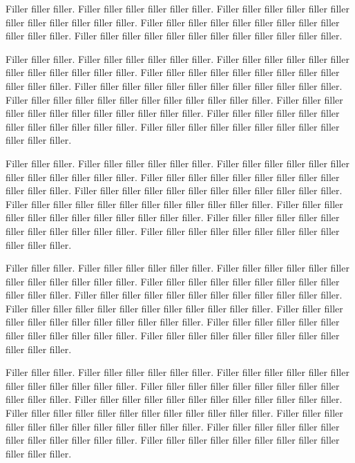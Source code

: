 \documentclass[landscape,twocolumn,letterpaper]{article}
\begin{document}
Filler filler filler.  Filler filler filler filler filler filler.
Filler filler filler filler filler filler filler filler filler filler
filler filler.  Filler filler filler filler filler filler filler filler
filler filler filler filler.  Filler filler filler filler filler filler
filler filler filler filler filler filler.

Filler filler filler.  Filler filler filler filler filler filler.
Filler filler filler filler filler filler filler filler filler filler
filler filler.  Filler filler filler filler filler filler filler filler
filler filler filler filler.  Filler filler filler filler filler filler
filler filler filler filler filler filler.  Filler filler filler filler
filler filler filler filler filler filler filler filler.  Filler filler
filler filler filler filler filler filler filler filler filler filler.
Filler filler filler filler filler filler filler filler filler filler
filler filler.  Filler filler filler filler filler filler filler filler
filler filler filler filler.

Filler filler filler.  Filler filler filler filler filler filler.
Filler filler filler filler filler filler filler filler filler filler
filler filler.  Filler filler filler filler filler filler filler filler
filler filler filler filler.  Filler filler filler filler filler filler
filler filler filler filler filler filler.  Filler filler filler filler
filler filler filler filler filler filler filler filler.  Filler filler
filler filler filler filler filler filler filler filler filler filler.
Filler filler filler filler filler filler filler filler filler filler
filler filler.  Filler filler filler filler filler filler filler filler
filler filler filler filler.

Filler filler filler.  Filler filler filler filler filler filler.
Filler filler filler filler filler filler filler filler filler filler
filler filler.  Filler filler filler filler filler filler filler filler
filler filler filler filler.  Filler filler filler filler filler filler
filler filler filler filler filler filler.  Filler filler filler filler
filler filler filler filler filler filler filler filler.  Filler filler
filler filler filler filler filler filler filler filler filler filler.
Filler filler filler filler filler filler filler filler filler filler
filler filler.  Filler filler filler filler filler filler filler filler
filler filler filler filler.

Filler filler filler.  Filler filler filler filler filler filler.
Filler filler filler filler filler filler filler filler filler filler
filler filler.  Filler filler filler filler filler filler filler filler
filler filler filler filler.  Filler filler filler filler filler filler
filler filler filler filler filler filler.  Filler filler filler filler
filler filler filler filler filler filler filler filler.  Filler filler
filler filler filler filler filler filler filler filler filler filler.
Filler filler filler filler filler filler filler filler filler filler
filler filler.  Filler filler filler filler filler filler filler filler
filler filler filler filler.
\end{document}
